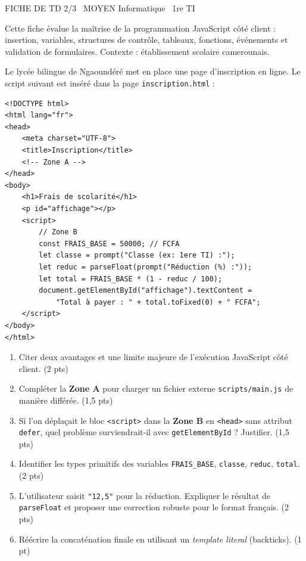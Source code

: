 \documentclass[11pt]{article}
\begin{document}
\begin{tcolorbox}[enhanced,colback=popink,colframe=popink,arc=10pt,boxrule=0pt,left=12pt,right=12pt,top=9pt,bottom=9pt]
{\color{white}\popxbold\small FICHE DE TD 2/3 \textbullet\ MOYEN \hfill Informatique \textbullet\ 1re TI\par}
\end{tcolorbox}
\vspace{4pt}
Cette fiche évalue la maîtrise de la programmation JavaScript côté client : insertion, variables, structures de contrôle, tableaux, fonctions, événements et validation de formulaires. Contexte : établissement scolaire camerounais.

\begin{exercice}
Le lycée bilingue de Ngaoundéré met en place une page d'inscription en ligne. Le script suivant est inséré dans la page \texttt{inscription.html} :
\begin{verbatim}
<!DOCTYPE html>
<html lang="fr">
<head>
    <meta charset="UTF-8">
    <title>Inscription</title>
    <!-- Zone A -->
</head>
<body>
    <h1>Frais de scolarité</h1>
    <p id="affichage"></p>
    <script>
        // Zone B
        const FRAIS_BASE = 50000; // FCFA
        let classe = prompt("Classe (ex: 1ere TI) :");
        let reduc = parseFloat(prompt("Réduction (%) :"));
        let total = FRAIS_BASE * (1 - reduc / 100);
        document.getElementById("affichage").textContent = 
            "Total à payer : " + total.toFixed(0) + " FCFA";
    </script>
</body>
</html>
\end{verbatim}
\begin{enumerate}
    \item Citer deux avantages et une limite majeure de l'exécution JavaScript côté client. (2 pts)
    \item Compléter la \textbf{Zone A} pour charger un fichier externe \texttt{scripts/main.js} de manière différée. (1,5 pts)
    \item Si l'on déplaçait le bloc \texttt{<script>} dans la \textbf{Zone B} en \texttt{<head>} sans attribut \texttt{defer}, quel problème surviendrait-il avec \texttt{getElementById} ? Justifier. (1,5 pts)
    \item Identifier les types primitifs des variables \texttt{FRAIS\_BASE}, \texttt{classe}, \texttt{reduc}, \texttt{total}. (2 pts)
    \item L'utilisateur saisit \texttt{"12,5"} pour la réduction. Expliquer le résultat de \texttt{parseFloat} et proposer une correction robuste pour le format français. (2 pts)
    \item Réécrire la concaténation finale en utilisant un \emph{template literal} (backticks). (1 pt)
\end{enumerate}
\end{exercice}
\end{document}
